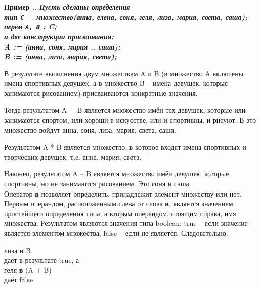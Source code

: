 \documentclass[10pt]{report}
\newcounter{exam}[section]
\renewcommand{\theexam}{\thesection.\arabic{exam}}
\newenvironment{Example}{\par\refstepcounter{exam}\bf Пример \theexam. \sl}{\rm\par}
\begin{document}
\begin{Example}
\textit{Пусть сделаны определения}\\
\rm 	
\hspace*{5mm} \textbf{тип} \texttt{C} = \textbf{множество}(анна, елена, соня, геля, лиза, мария, света, саша);\\
\hspace*{5mm} \textbf{перем} \texttt{A, B} : C;\\

\textit{и две конструкции присваивания:}\\
\hspace*{5mm} A := (анна, соня, мария .. саша); \\
\hspace*{5mm} B := (анна, лиза, мария, света); \\
\end{Example}
В результате выполнения двум множествам A и B (в множество A включены имена спортивных девушек, а в множество B -- имена девушек, которые занимаются рисованием) присваиваются конкретные значения.

Тогда результатом A + B является множество имён тех девушек, которые или занимаются спортом, или хороши в искусстве, или и спортивны, и рисуют. В это множество войдут анна, соня, лиза, мария, света, саша.

Результатом A * B является множество, в которое входят имена спортивных и творческих девушек, т.е. анна, мария, света.

Наконец, результатом A -- B является множество имён девушек, которые спортивны, но не занимаются рисованием. Это соня и саша.\\

Оператор \textbf{в} позволяет определить, принадлежит элемент множеству или нет. Первым операндом, расположенным слева от слова \textbf{в}, является значением простейшего определения типа, а вторым операндом, стоящим справа, имя множества. Результатом являются значения типа boolean: true -- если значение является элементом множества; false -- если не является.
Следовательно,
\begin{flushleft}
\hspace*{5mm} лиза \textbf{в} B \\
\hspace*{5mm} даёт в результате true, а \\
\hspace*{5mm} геля \textbf{в} (A + B) \\
\hspace*{5mm} даёт false \\
\end{flushleft}
\end{document}

